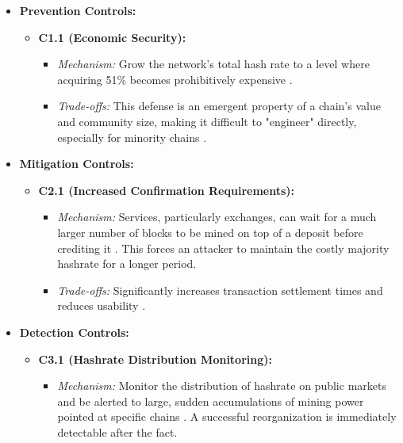 \begin{itemize}
    \item \textbf{Prevention Controls:}
    \begin{itemize}
        \item \textbf{C1.1 (Economic Security):}
            \begin{itemize}
                \item \textit{Mechanism:} Grow the network's total hash rate to a level where acquiring 51\% becomes prohibitively expensive \cite{wang2019}.
                \item \textit{Trade-offs:} This defense is an emergent property of a chain's value and community size, making it difficult to "engineer" directly, especially for minority chains \cite{eyal2014}.
            \end{itemize}
    \end{itemize}
    \item \textbf{Mitigation Controls:}
    \begin{itemize}
        \item \textbf{C2.1 (Increased Confirmation Requirements):}
            \begin{itemize}
                \item \textit{Mechanism:} Services, particularly exchanges, can wait for a much larger number of blocks to be mined on top of a deposit before crediting it \cite{casino2019}. This forces an attacker to maintain the costly majority hashrate for a longer period.
                \item \textit{Trade-offs:} Significantly increases transaction settlement times and reduces usability \cite{casino2019}.
            \end{itemize}
    \end{itemize}
    \item \textbf{Detection Controls:}
    \begin{itemize}
        \item \textbf{C3.1 (Hashrate Distribution Monitoring):}
            \begin{itemize}
                \item \textit{Mechanism:} Monitor the distribution of hashrate on public markets and be alerted to large, sudden accumulations of mining power pointed at specific chains \cite{wang2019}. A successful reorganization is immediately detectable after the fact.
            \end{itemize}
    \end{itemize}
\end{itemize}

